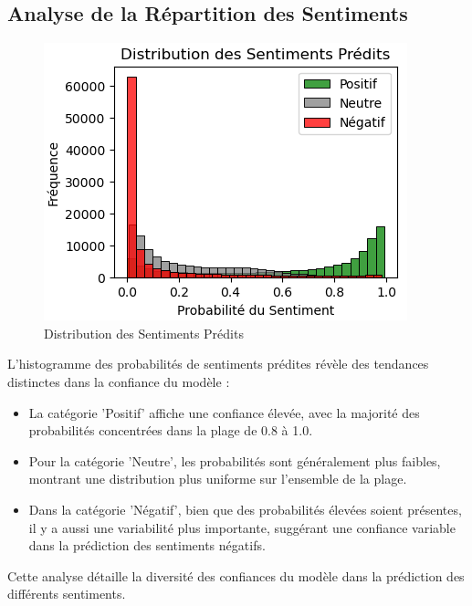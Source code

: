 

\subsection{Analyse de la Répartition des Sentiments}

\begin{figure}[h]
    \centering
    \includegraphics[scale=0.6]{assets/distributionsentimentsRoberta.PNG}
    \caption{Distribution des Sentiments Prédits}
    \label{fig:robertaSentiments}
\end{figure}
L'histogramme des probabilités de sentiments prédites révèle des tendances distinctes dans la confiance du modèle :

\begin{itemize}
    \item La catégorie 'Positif' affiche une confiance élevée, avec la majorité des probabilités concentrées dans la plage de 0.8 à 1.0.
    
    \item Pour la catégorie 'Neutre', les probabilités sont généralement plus faibles, montrant une distribution plus uniforme sur l'ensemble de la plage.
    
    \item Dans la catégorie 'Négatif', bien que des probabilités élevées soient présentes, il y a aussi une variabilité plus importante, suggérant une confiance variable dans la prédiction des sentiments négatifs.
\end{itemize}

Cette analyse détaille la diversité des confiances du modèle dans la prédiction des différents sentiments.



